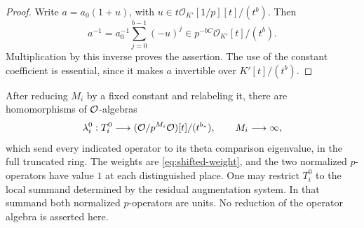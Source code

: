 \begin{proof}
Write $a=a_0(1+u)$, with $u\in t\mathcal O_{K'}[1/p][t]/(t^b)$.
Then
\[
 a^{-1}=a_0^{-1}\sum_{j=0}^{b-1}(-u)^j
          \in p^{-bC}\mathcal O_{K'}[t]/(t^b).
\]
Multiplication by this inverse proves the assertion.  The use of
the constant coefficient is essential, since it makes $a$
invertible over $K'[t]/(t^b)$.
\end{proof}

\begin{proposition}
\label{prop:cusp-congruence}
After reducing $M_i$ by a fixed constant and relabeling it, there
are homomorphisms of $\mathcal O$-algebras
\begin{equation}
 \lambda_i^0:T_i^0\longrightarrow
                  (\mathcal O/p^{M_i}\mathcal O)[t]/(t^{b_*}),
 \qquad M_i\longrightarrow\infty,
 \label{eq:hecke-congruence}
\end{equation}
which send every indicated operator to its theta comparison
eigenvalue, in the full truncated ring.  The weights are
\cref{eq:shifted-weight}, and the two normalized $p$-operators
have value $1$ at each distinguished place.
One may restrict $T_i^0$ to the local summand determined by
the residual augmentation system.  In that summand both
normalized $p$-operators are units.  No reduction of the operator
algebra is asserted here.
\end{proposition}

